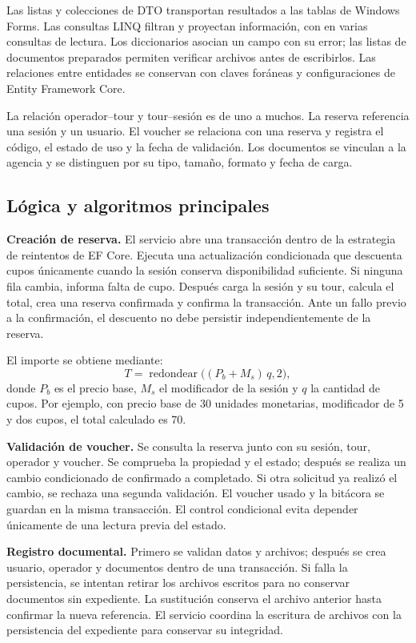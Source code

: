 Las listas y colecciones de DTO transportan resultados a las tablas de Windows Forms. Las consultas LINQ filtran y proyectan información, con  en varias consultas de lectura. Los diccionarios  asocian un campo con su error; las listas de documentos preparados permiten verificar archivos antes de escribirlos. Las relaciones entre entidades se conservan con claves foráneas y configuraciones de Entity Framework Core.

La relación operador--tour y tour--sesión es de uno a muchos. La reserva referencia una sesión y un usuario. El voucher se relaciona con una reserva y registra el código, el estado de uso y la fecha de validación. Los documentos se vinculan a la agencia y se distinguen por su tipo, tamaño, formato y fecha de carga.

\subsection{Lógica y algoritmos principales}
\textbf{Creación de reserva.} El servicio abre una transacción dentro de la estrategia de reintentos de EF Core. Ejecuta una actualización condicionada que descuenta cupos únicamente cuando la sesión conserva disponibilidad suficiente. Si ninguna fila cambia, informa falta de cupo. Después carga la sesión y su tour, calcula el total, crea una reserva confirmada y confirma la transacción. Ante un fallo previo a la confirmación, el descuento no debe persistir independientemente de la reserva.

El importe se obtiene mediante:
\[
T=\operatorname{redondear}\bigl((P_b+M_s)\,q,2\bigr),
\]
donde $P_b$ es el precio base, $M_s$ el modificador de la sesión y $q$ la cantidad de cupos. Por ejemplo, con precio base de 30 unidades monetarias, modificador de 5 y dos cupos, el total calculado es 70.

\textbf{Validación de voucher.} Se consulta la reserva junto con su sesión, tour, operador y voucher. Se comprueba la propiedad y el estado; después se realiza un cambio condicionado de confirmado a completado. Si otra solicitud ya realizó el cambio, se rechaza una segunda validación. El voucher usado y la bitácora se guardan en la misma transacción. El control condicional evita depender únicamente de una lectura previa del estado.

\textbf{Registro documental.} Primero se validan datos y archivos; después se crea usuario, operador y documentos dentro de una transacción. Si falla la persistencia, se intentan retirar los archivos escritos para no conservar documentos sin expediente. La sustitución conserva el archivo anterior hasta confirmar la nueva referencia. El servicio coordina la escritura de archivos con la persistencia del expediente para conservar su integridad.

